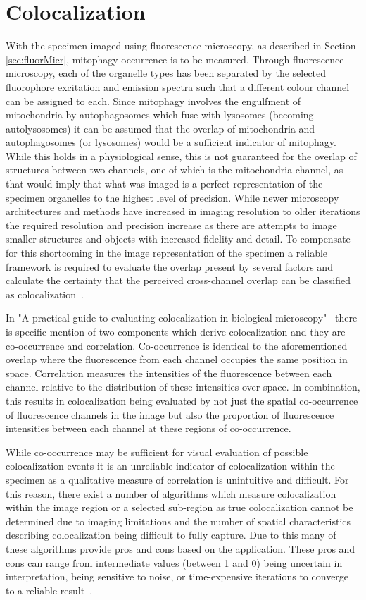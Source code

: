 \section{Colocalization}\label{sec:coloc}
With the specimen imaged using fluorescence microscopy, as described in Section \ref{sec:fluorMicr}, mitophagy occurrence is to be measured. Through fluorescence microscopy, each of the organelle types has been separated by the selected fluorophore excitation and emission spectra such that a different colour channel can be assigned to each. Since mitophagy involves the engulfment of mitochondria by autophagosomes which fuse with lysosomes (becoming autolysosomes) it can be assumed that the overlap of mitochondria and autophagosomes (or lysosomes) would be a sufficient indicator of mitophagy. While this holds in a physiological sense, this is not guaranteed for the overlap of structures between two channels, one of which is the mitochondria channel, as that would imply that what was imaged is a perfect representation of the specimen organelles to the highest level of precision. While newer microscopy architectures and methods have increased in imaging resolution to older iterations the required resolution and precision increase as there are attempts to image smaller structures and objects with increased fidelity and detail. To compensate for this shortcoming in the image representation of the specimen a reliable framework is required to evaluate the overlap present by several factors and calculate the certainty that the perceived cross-channel overlap can be classified as colocalization~\cite{practical_guide_coloc}.\par In "A practical guide to evaluating colocalization in biological microscopy"~\cite{practical_guide_coloc} there is specific mention of two components which derive colocalization and they are co-occurrence and correlation. Co-occurrence is identical to the aforementioned overlap where the fluorescence from each channel occupies the same position in space. Correlation measures the intensities of the fluorescence between each channel relative to the distribution of these intensities over space. In combination, this results in colocalization being evaluated by not just the spatial co-occurrence of fluorescence channels in the image but also the proportion of fluorescence intensities between each channel at these regions of co-occurrence.\par While co-occurrence may be sufficient for visual evaluation of possible colocalization events it is an unreliable indicator of colocalization within the specimen as a qualitative measure of correlation is unintuitive and difficult. For this reason, there exist a number of algorithms which measure colocalization within the image region or a selected sub-region as true colocalization cannot be determined due to imaging limitations and the number of spatial characteristics describing colocalization being difficult to fully capture. Due to this many of these algorithms provide pros and cons based on the application. These pros and cons can range from intermediate values (between 1 and 0) being uncertain in interpretation, being sensitive to noise, or time-expensive iterations to converge to a reliable result~\cite{Bolte-2006}. 